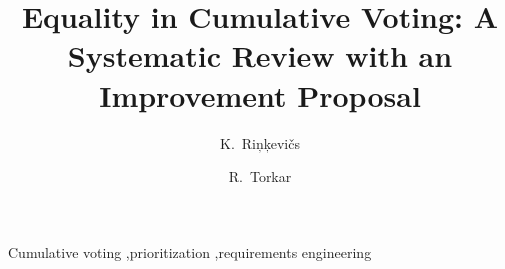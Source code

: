 \begin{frontmatter}
\title{Equality in Cumulative Voting: A Systematic Review with an Improvement Proposal}


\author[aff1]{K.~Ri{\c n}{\c k}evi{\v c}s}
\author[aff1,aff2]{R.~Torkar}
\address[aff1]{Blekinge Institute of Technology, Sweden}
\address[aff2]{Chalmers University of Technology and University of Gothenburg, Sweden}


\begin{abstract}

\end{abstract}

\begin{keyword}
Cumulative voting \sep prioritization \sep requirements engineering
\end{keyword}

\end{frontmatter}
